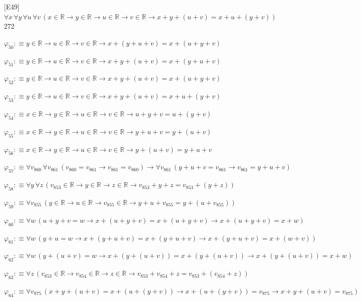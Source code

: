 \begin{fullproof}{[E49]}{$\forall x\,\forall y\,\forall u\,\forall v\,(x \in \mathbb{R} \to y \in \mathbb{R} \to u \in \mathbb{R} \to v \in \mathbb{R} \to x + y + (u + v) = x + u + (y + v))$}{272}
\begin{abbrevlist}
\item $\varphi_{50} :\equiv y \in \mathbb{R} \to u \in \mathbb{R} \to v \in \mathbb{R} \to x + (y + u + v) = x + (u + y + v)$
\item $\varphi_{51} :\equiv y \in \mathbb{R} \to u \in \mathbb{R} \to v \in \mathbb{R} \to x + y + (u + v) = x + (y + u + v)$
\item $\varphi_{52} :\equiv y \in \mathbb{R} \to u \in \mathbb{R} \to v \in \mathbb{R} \to x + y + (u + v) = x + (u + y + v)$
\item $\varphi_{53} :\equiv y \in \mathbb{R} \to u \in \mathbb{R} \to v \in \mathbb{R} \to x + y + (u + v) = x + u + (y + v)$
\item $\varphi_{54} :\equiv x \in \mathbb{R} \to y \in \mathbb{R} \to u \in \mathbb{R} \to v \in \mathbb{R} \to u + y + v = u + (y + v)$
\item $\varphi_{55} :\equiv x \in \mathbb{R} \to y \in \mathbb{R} \to u \in \mathbb{R} \to v \in \mathbb{R} \to y + u + v = y + (u + v)$
\item $\varphi_{56} :\equiv x \in \mathbb{R} \to y \in \mathbb{R} \to u \in \mathbb{R} \to v \in \mathbb{R} \to y + (u + v) = y + u + v$
\item $\varphi_{57} :\equiv \forall v_{860}\,\forall v_{861}\,(v_{860} = v_{861} \to v_{861} = v_{860}) \to \forall v_{861}\,(y + u + v = v_{861} \to v_{861} = y + u + v)$
\item $\varphi_{58} :\equiv \forall y\,\forall z\,(v_{853} \in \mathbb{R} \to y \in \mathbb{R} \to z \in \mathbb{R} \to v_{853} + y + z = v_{853} + (y + z))$
\item $\varphi_{59} :\equiv \forall v_{855}\,(y \in \mathbb{R} \to u \in \mathbb{R} \to v_{855} \in \mathbb{R} \to y + u + v_{855} = y + (u + v_{855}))$
\item $\varphi_{60} :\equiv \forall w\,(u + y + v = w \to x + (u + y + v) = x + (u + y + v) \to x + (u + y + v) = x + w)$
\item $\varphi_{61} :\equiv \forall w\,(y + u = w \to x + (y + u + v) = x + (y + u + v) \to x + (y + u + v) = x + (w + v))$
\item $\varphi_{62} :\equiv \forall w\,(y + (u + v) = w \to x + (y + (u + v)) = x + (y + (u + v)) \to x + (y + (u + v)) = x + w)$
\item $\varphi_{63} :\equiv \forall z\,(v_{853} \in \mathbb{R} \to v_{854} \in \mathbb{R} \to z \in \mathbb{R} \to v_{853} + v_{854} + z = v_{853} + (v_{854} + z))$
\item $\varphi_{64} :\equiv \forall v_{875}\,(x + y + (u + v) = x + (u + (y + v)) \to x + (u + (y + v)) = v_{875} \to x + y + (u + v) = v_{875})$

\end{abbrevlist}
\end{fullproof}
